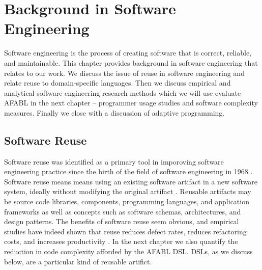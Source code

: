 \chapter{Background in Software Engineering}\label{ch:se}

Software engineering is the process of creating software that is correct, reliable, and maintainable. This chapter provides background in software engineering that relates to our work. We discuss the issue of reuse in software engineering and relate reuse to domain-specific languages. Then we discuss empirical and analytical software engineering research methods which we will use evaluate AFABL in the next chapter -- programmer usage studies and software complexity measures. Finally we close with a discussion of adaptive programming.

\section{Software Reuse}

Software reuse was identified as a primary tool in imporoving software engineering practice since the birth of the field of software engineering in 1968 \cite{mcilroy1968mass}. Software reuse means means using an existing software artifact in a new software system, ideally without modifying the original artifact \cite{krueger1992a-software,frakes2005a-software}. Reusable artifacts may be source code libraries, components, programming languages, and application frameworks \cite{polancic2010a-an-empirical} as well as concepts such as software schemas, architectures, and design patterns. The benefits of software reuse seem obvious, and empirical studies have indeed shown that reuse reduces defect rates, reduces refactoring costs, and increases productivity \cite{basili1996a-how-reuse,mohagheghi2008a-an-empirical}. In the next chapter we also quantify the reduction in code complexity afforded by the AFABL DSL. DSLs, as we discuss below, are a particular kind of reusable artifict.

